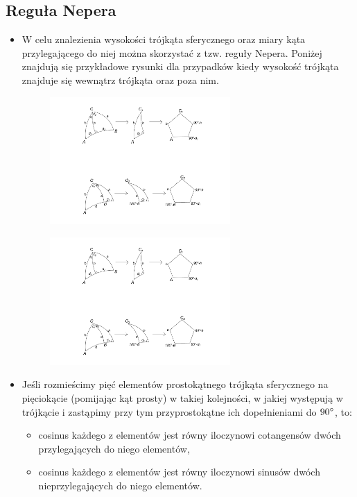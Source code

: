 \documentclass[10pt, twoside, fleqn]{article}
\begin{document}
\subsection{Reguła Nepera}	\label{regula_nepera}

			\begin{itemize}
				\item 	W celu znalezienia wysokości trójkąta sferycznego oraz
						miary kąta przylegającego do niej 
						można skorzystać z tzw. reguły Nepera. Poniżej znajdują
						się przykładowe rysunki dla przypadków kiedy wysokość
						trójkąta znajduje się wewnątrz trójkąta oraz poza nim.
					\\
						\begin{figure}[h!]
  							\centering
  							\includegraphics[width=0.65\textwidth]
  											{neper_wew.pdf}
						\end{figure}

						\begin{figure}[h!]
  							\centering
  							\includegraphics[width=0.65\textwidth]
  											{neper_zew.pdf}
						\end{figure}	
					
				\item 	Jeśli rozmieścimy pięć elementów prostokątnego trójkąta
						sferycznego na pięciokącie (pomijając kąt prosty) w takiej 
						kolejności, w jakiej występują w trójkącie i zastąpimy 
						przy tym przyprostokątne ich dopełnieniami 
						do $90\degree$, to:
						\begin{itemize}
							\item 	cosinus każdego z elementów jest równy 
									iloczynowi cotangensów dwóch przylegających 
									do niego elementów,
							\item	cosinus każdego z elementów jest równy 
									iloczynowi sinusów dwóch nieprzylegających 
									do niego elementów.
									

\end{itemize}
\end{itemize}
\end{document}
